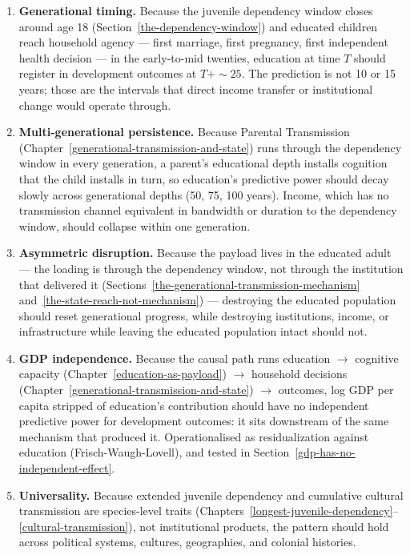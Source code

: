 \documentclass[12pt,letterpaper]{article}
\begin{document}
\begin{enumerate}
\item \textbf{Generational timing.} Because the juvenile dependency
window closes around age 18 (Section~\ref{the-dependency-window}) and
educated children reach household agency --- first marriage, first
pregnancy, first independent health decision --- in the early-to-mid
twenties, education at time $T$ should register in development outcomes
at $T+{\sim}25$. The prediction is not 10 or 15 years; those are
the intervals that direct income transfer or institutional change would
operate through.\label{pred:timing}

\item \textbf{Multi-generational persistence.} Because Parental
Transmission (Chapter~\ref{generational-transmission-and-state}) runs through the dependency
window in every generation, a parent's educational depth installs
cognition that the child installs in turn, so education's predictive
power should decay slowly across generational depths (50, 75, 100
years). Income, which has no transmission channel equivalent in
bandwidth or duration to the dependency window, should collapse within
one generation.\label{pred:persistence}

\item \textbf{Asymmetric disruption.} Because the payload lives in the
educated adult --- the loading is through the dependency window, not
through the institution that delivered it
(Sections~\ref{the-generational-transmission-mechanism}
and~\ref{the-state-reach-not-mechanism}) --- destroying the educated
population should reset generational progress, while destroying
institutions, income, or infrastructure while leaving the educated
population intact should not.\label{pred:disruption}

\item \textbf{GDP independence.} Because the causal path runs
education $\to$ cognitive capacity (Chapter~\ref{education-as-payload})
$\to$ household decisions (Chapter~\ref{generational-transmission-and-state}) $\to$ outcomes,
log GDP per capita stripped of education's contribution should have no independent
predictive power for development outcomes: it sits downstream of the
same mechanism that produced it. Operationalised as residualization
against education (Frisch-Waugh-Lovell), and tested in
Section~\ref{gdp-has-no-independent-effect}.\label{pred:income}

\item \textbf{Universality.} Because extended juvenile dependency and
cumulative cultural transmission are species-level traits
(Chapters~\ref{longest-juvenile-dependency}--\ref{cultural-transmission}),
not institutional products, the pattern should hold across political
systems, cultures, geographies, and colonial histories.\label{pred:universality}


\end{enumerate}
\end{document}
